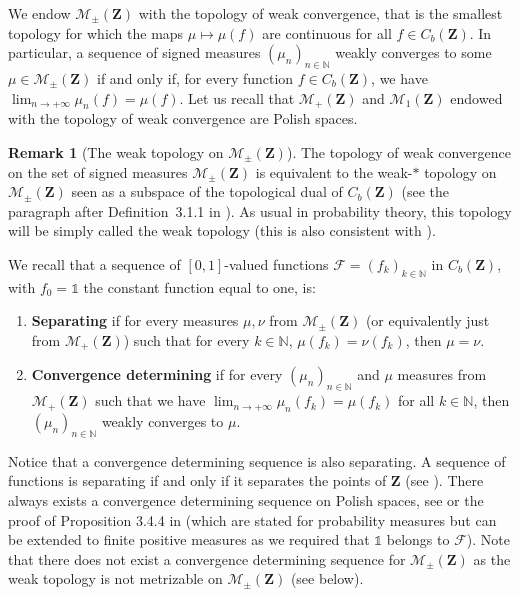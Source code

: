 \documentclass{amsart}
\theoremstyle{plain}
\theoremstyle{definition}
\newtheorem{remark}[Th]{Remark}
\newcommand{\Space}{\mathbf{Z}}
\newcommand{\Proba}{\mathcal{M}_1(\Space)}
\newcommand{\Meas}{\mathcal{M}_+(\Space)}
\newcommand{\SignedMeas}{\mathcal{M}_{\pm}(\Space)}
\newcommand{\CbFunct}{C_b(\Space)}
\newcommand{\F}{\mathcal{F}}
\newcommand{\un}{\mathds{1}}
\newcommand{\N}{\mathbb{N}}
\begin{document}
We endow $\SignedMeas$ with the topology of weak convergence,
that is the smallest topology for which the maps $\mu \mapsto \mu(f)$
are continuous for all $f\in\CbFunct$.
In particular, a sequence  of signed measures $(\mu_n)_{n\in\N}$  weakly converges  to
some $\mu\in\SignedMeas$    if  and only if, for    every   function    $f\in   \CbFunct$,    we   have
$\lim_{n\to +\infty} \mu_n(f) = \mu(f)$.
 Let us recall that $\Meas$ and $\Proba$ endowed with  the topology of weak convergence
are Polish spaces. 




\begin{remark}[The weak topology on $\SignedMeas$]
The topology of weak convergence on the set of signed measures $\SignedMeas$
is equivalent to the weak-$*$ topology on $\SignedMeas$
seen as a subspace of the topological dual of $\CbFunct$
(see the paragraph after Definition~3.1.1 in \cite{Bogachev}).
As usual in probability theory, this topology will be simply called the
weak topology (this is also consistent with \cite{Bogachev}).
\end{remark}


We recall that a sequence of $[0,1]$-valued functions $\F = (f_k )_{k\in\N}$ in $\CbFunct$,
with $f_0=\un$ the constant function equal to one, is:
\begin{enumerate}[label=(\roman*)]
\item  \textbf{Separating}   if  for   every  measures   $\mu,\nu$  from
  $\SignedMeas$ (or equivalently just from  $\Meas$) such that for every
  $k\in\N$, $\mu(f_k) = \nu(f_k)$, then $\mu = \nu$.
\item  \textbf{Convergence determining}  if   for  every
  $(\mu_n)_{n\in\N}$  and  $\mu$   measures  from  $\Meas$  such  that we have
  $\lim_{n\to +\infty} \mu_n(f_k)  = \mu(f_k)$ for
  all $k\in\N$, then $(\mu_n )_{n\in\N}$ weakly converges to $\mu$.
\end{enumerate}
Notice that a convergence determining sequence is also separating.
A sequence of functions is separating if and only if it separates the points of $\Space$
	(see \cite[Theorem 3.4.5]{Ethier}).
There always exists a convergence determining sequence on Polish spaces,
see \cite[Corollary 2.2.6]{Bogachev} or 
 the proof of Proposition  3.4.4 in \cite{Ethier} 
 (which are stated for probability measures but can be extended
to finite  positive measures  as we required  that $\un$  belongs to $\F$).
Note that there does not exist a convergence determining sequence for $\SignedMeas$
	as the weak topology is not metrizable on $\SignedMeas$
	(see  below).
\end{document}

